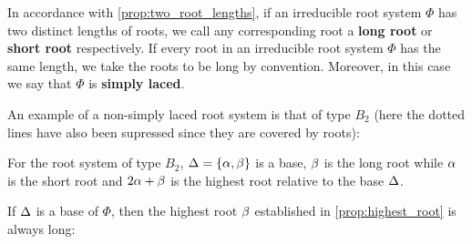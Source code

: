 \documentclass[12pt,reqno,oneside]{amsart}
\begin{document}
    In accordance with \cref{prop:two_root_lengths}, if an irreducible root system $\Phi$ has two distinct lengths of roots, we call any corresponding root a \textbf{long root} or \textbf{short root} respectively. If every root in an irreducible root system $\Phi$ has the same length, we take the roots to be long by convention. Moreover, in this case we say that $\Phi$ is \textbf{simply laced}.
    
    An example of a non-simply laced root system is that of type $B_{2}$ (here the dotted lines have also been supressed since they are covered by roots):

    \begin{center}
    \end{center}

    For the root system of type $B_{2}$, $\Delta = \{\alpha,\beta\}$ is a base, $\beta$ is the long root while $\alpha$ is the short root and $2\alpha+\beta$ is the highest root relative to the base $\Delta$.
    
    If $\Delta$ is a base of $\Phi$, then the highest root $\beta$ established in \cref{prop:highest_root} is always long:
\end{document}
